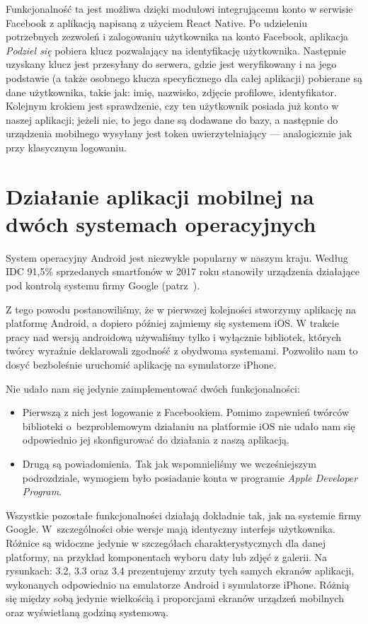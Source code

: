 \documentclass[licencjacka]{pracamgr}
\begin{document}
Funkcjonalność ta jest możliwa dzięki modułowi integrującemu konto w serwisie Facebook z aplikacją napisaną z użyciem React Native. Po udzieleniu potrzebnych zezwoleń i zalogowaniu użytkownika na konto Facebook, aplikacja \textit{Podziel się} pobiera klucz pozwalający na identyfikację użytkownika. Następnie uzyskany klucz jest przesyłany do serwera, gdzie jest weryfikowany i na jego podstawie (a także osobnego klucza specyficznego dla całej aplikacji) pobierane są dane użytkownika, takie jak: imię, nazwisko, zdjęcie profilowe, identyfikator. Kolejnym krokiem jest sprawdzenie, czy ten użytkownik posiada już konto w naszej aplikacji; jeżeli nie, to jego dane są dodawane do bazy, a następnie do urządzenia mobilnego wysyłany jest token uwierzytelniający --- analogicznie jak przy klasycznym logowaniu.

\section{Działanie aplikacji mobilnej na dwóch systemach operacyjnych}

System operacyjny Android jest niezwykle popularny w naszym kraju. Według IDC 91,5\% sprzedanych smartfonów w 2017 roku stanowiły urządzenia działające pod kontrolą systemu firmy Google (patrz~\cite{popularnoscAndroid}).

Z tego powodu postanowiliśmy, że w pierwszej kolejności stworzymy aplikację na platformę Android, a dopiero później zajmiemy się systemem iOS\@. W trakcie pracy nad wersją androidową używaliśmy tylko i wyłącznie bibliotek, których twórcy wyraźnie deklarowali zgodność z obydwoma systemami. Pozwoliło nam to dosyć bezboleśnie uruchomić aplikację na symulatorze iPhone.

Nie udało nam się jedynie zaimplementować dwóch funkcjonalności:
\begin{itemize}
\item Pierwszą z nich jest logowanie z Facebookiem. Pomimo zapewnień twórców biblioteki o~bezproblemowym działaniu na platformie iOS nie udało nam się odpowiednio jej skonfigurować do działania z naszą aplikacją.
\item Drugą są powiadomienia. Tak jak wspomnieliśmy we wcześniejszym podrozdziale, wymogiem było posiadanie konta w programie \textit{Apple Developer Program}.
\end{itemize}
Wszystkie pozostałe funkcjonalności działają dokładnie tak, jak na systemie firmy Google. W~szczególności obie wersje mają identyczny interfejs użytkownika. Różnice są widoczne jedynie w szczegółach charakterystycznych dla danej platformy, na przykład komponentach wyboru daty lub zdjęć z galerii. Na rysunkach: 3.2, 3.3 oraz 3.4 prezentujemy zrzuty tych samych ekranów aplikacji, wykonanych odpowiednio na emulatorze Android i symulatorze iPhone. Różnią się między sobą jedynie wielkością i proporcjami ekranów urządzeń mobilnych oraz wyświetlaną godziną systemową.
\end{document}
